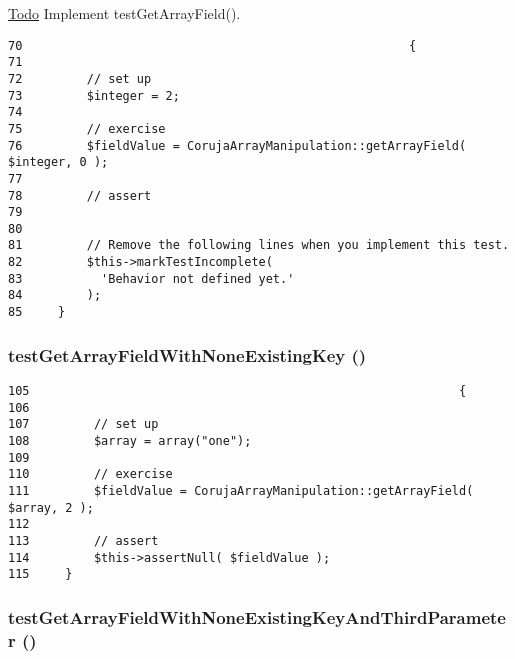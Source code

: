 \begin{Desc}
\item[\hyperlink{todo__todo000005}{Todo}]Implement testGetArrayField(). \end{Desc}


\begin{Code}\begin{verbatim}70                                                      {
71 
72         // set up
73         $integer = 2;
74 
75         // exercise
76         $fieldValue = CorujaArrayManipulation::getArrayField( $integer, 0 );
77 
78         // assert
79 
80 
81         // Remove the following lines when you implement this test.
82         $this->markTestIncomplete(
83           'Behavior not defined yet.'
84         );
85     }
\end{verbatim}
\end{Code}


\hypertarget{class_coruja_array_manipulation_test_f87353adad0450eaa29c202a0b132262}{
\subsubsection[{testGetArrayFieldWithNoneExistingKey}]{\setlength{\rightskip}{0pt plus 5cm}testGetArrayFieldWithNoneExistingKey ()}}
\label{class_coruja_array_manipulation_test_f87353adad0450eaa29c202a0b132262}




\begin{Code}\begin{verbatim}105                                                            {
106 
107         // set up
108         $array = array("one");
109 
110         // exercise
111         $fieldValue = CorujaArrayManipulation::getArrayField( $array, 2 );
112 
113         // assert
114         $this->assertNull( $fieldValue );
115     }
\end{verbatim}
\end{Code}


\hypertarget{class_coruja_array_manipulation_test_9e14aea717bc3184296db73c59340944}{
\subsubsection[{testGetArrayFieldWithNoneExistingKeyAndThirdParameter}]{\setlength{\rightskip}{0pt plus 5cm}testGetArrayFieldWithNoneExistingKeyAndThirdParameter ()}}
\label{class_coruja_array_manipulation_test_9e14aea717bc3184296db73c59340944}




